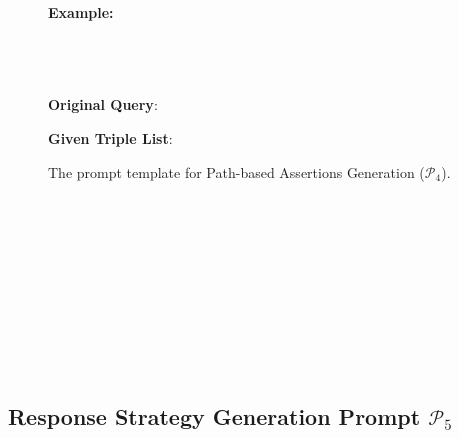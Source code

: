 \documentclass[11pt]{article}
\begin{document}
\begin{figure}[H]
\begin{tcolorbox}
    \textbf{Example:} \\
    \text{[EXAMPLE\_1]} \\
    \text{[EXAMPLE\_2]} \\
    \text{[EXAMPLE\_3]} \\
    

    \vspace{0.3cm}

    \textbf{Original Query}: \\
    \text{[Query]}

    \textbf{Given Triple List}: \\
    \end{tcolorbox}
    \caption{The prompt template for Path-based Assertions Generation ($\mathcal{P}_4$).}
    \label{fig:p4}
\end{figure}

\text{} \\
\text{} \\
\text{} \\
\text{} \\
\text{} \\
\text{} \\
\text{} \\
\text{} \\
\text{} \\
\text{}


\subsection{Response Strategy Generation Prompt \hyperref[fig:p5]{$ \mathcal{P}_5 $}}
\end{document}
